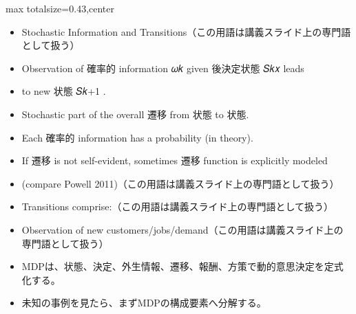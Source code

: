 \clearpage
{}
\begin{minipage}[t]{0.405\textwidth}
\begin{adjustbox}{max totalsize={\textwidth}{0.43\textheight},center}
\begin{minipage}{\textwidth}\scriptsize
{}\begin{itemize}
\item Stochastic Information and Transitions（この用語は講義スライド上の専門語として扱う）
\item Observation of 確率的 information 𝜔𝑘 given 後決定状態 𝑆𝑘𝑥 leads
\item to new 状態 𝑆𝑘+1 .
\item Stochastic part of the overall 遷移 from 状態 to 状態.
\item Each 確率的 information has a probability (in theory).
\item If 遷移 is not self-evident, sometimes 遷移 function is explicitly modeled
\item (compare Powell 2011)（この用語は講義スライド上の専門語として扱う）
\item Transitions comprise:（この用語は講義スライド上の専門語として扱う）
\item Observation of new customers/jobs/demand（この用語は講義スライド上の専門語として扱う）
\end{itemize}\begin{itemize}
\item MDPは、状態、決定、外生情報、遷移、報酬、方策で動的意思決定を定式化する。
\item 未知の事例を見たら、まずMDPの構成要素へ分解する。
\end{itemize}
\end{minipage}
\end{adjustbox}
\end{minipage}\hfill
